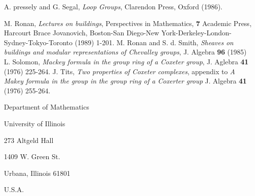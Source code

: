 \begin{thebibliography}{99}
 A. pressely and G. Segal, \textit{Loop Groups}, Clarendon Press, Oxford (1986).

 M. Ronan, \textit{Lectures on buildings}, Perspectives in Mathematics, {\bf 7} Academic Press, Harcourt Brace Jovanovich, Boston-San Diego-New York-Derkeley-London-Sydney-Tokyo-Toronto (1989) 1-201.
 M. Ronan and S. d. Smith, \textit{Sheaves on buildings and modular representations of Chevalley groups}, J. Algebra {\bf 96} (1985)
 L. Solomon, \textit{Mackey formula in the group ring of a Coxeter group}, J. Aglebra {\bf 41} (1976) 225-264.
 J. Tits, \textit{Two properties of Coxeter complexes}, appendix to \textit{A Makey formula in the group in the group ring of a Coxerter group} J. Algebra {\bf 41} (1976) 255-264.
\end{thebibliography}


\begin{flushleft}
Department of Mathematics

University of Illinois

273 Altgeld Hall

1409 W. Green St.

Urbana, Illinois 61801

U.S.A.
\end{flushleft}
